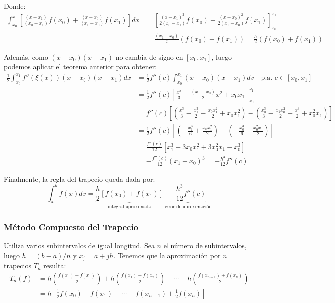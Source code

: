 Donde: \begin{align*}
\int_{x_0}^{x_1} 
\left[ \frac{(x - x_1)}{(x_0 - x_1)} f(x_0) + \frac{(x - x_0)}{(x_1 - x_0)} f(x_1)
\right] dx 
&= \left[ \frac{(x-x_1)^2}{2(x_0 - x_1)} f(x_0) 
+ \frac{(x-x_0)^2}{2(x_1 - x_0)} f(x_1) \right]_{x_0}^{x_1} \\
&= \frac{(x_1 - x_0)}{2} (f(x_0) + f(x_1)) = \frac{h}{2} (f(x_0) + f(x_1))
\end{align*}

Además, como \((x-x_0)(x-x_1)\) no cambia de signo en \([x_0,x_1]\),
luego podemos aplicar el teorema anterior para obtener: \begin{align*}
\frac{1}{2} \int_{x_0}^{x_1} f''(\xi(x)) (x-x_0)(x-x_1) dx
&= \frac{1}{2} f''(c) \int_{x_0}^{x_1} (x-x_0)(x-x_1) dx \quad
\text{p.a. } c \in [x_0, x_1] \\
&= \frac{1}{2} f''(c) \left[\frac{x^3}{3} 
- \frac{(x_1-x_0)}{2}x^2+x_0 x_1 \right]_{x_0}^{x_1} \\
&= f''(c) \left[ 
\left(\frac{x_1^3}{3}-\frac{x_1^3}{2}-\frac{x_0 x_1^2}{2} + x_0 x_1^2 \right) 
- \left( \frac{x_0^3}{3}-\frac{x_1 x_0^2}{2}-\frac{x_0^3}{2} + x_0^2 x_1 \right)
\right] \\
&= \frac{1}{2} f''(c) \left[ \left( - \frac{x_1^3}{6} + \frac{x_0 x_1^2}{2} \right) 
- \left( - \frac{x_0^3}{6} + \frac{x_0^2 x_1}{2} \right) \right] \\
&= \frac{f''(c)}{12} \left[ x_1^3 - 3 x_0 x_1^2  + 3 x_0^2 x_1 - x_0^3 \right] \\
&= - \frac{f''(c)}{12} (x_1 - x_0)^3 = -\frac{h^3}{12} f''(c)
\end{align*}

Finalmente, la regla del trapecio queda dada por: \[
\int_a^b f(x) dx = 
\underbrace{\frac{h}{2} [f(x_0) + f(x_1)]}_{\text{integral aproximada}} 
\  \underbrace{- \frac{h^3}{12} f''(c)}_{\text{error de aproximación}}
\]

\hypertarget{muxe9todo-compuesto-del-trapecio}{%
\subsubsection{Método Compuesto del
Trapecio}\label{muxe9todo-compuesto-del-trapecio}}

Utiliza varios subintervalos de igual longitud. Sea \(n\) el número de
subintervalos, luego \(h = (b-a)/n\) y \(x_j = a + jh\). Tenemos que la
aproximación por \(n\) trapecios \(T_n\) resulta: \begin{align*}
T_n(f) 
&= h \left( \frac{f(x_0) + f(x_1)}{2} \right) 
+ h \left( \frac{f(x_1) + f(x_2)}{2} \right)
+ \cdots
+ h \left( \frac{f(x_{n-1}) + f(x_n)}{2} \right) \\
&= h \left[\frac{1}{2}f(x_0) + f(x_1)+\cdots+f(x_{n-1}) + \frac{1}{2}f(x_n)\right]
\end{align*}

